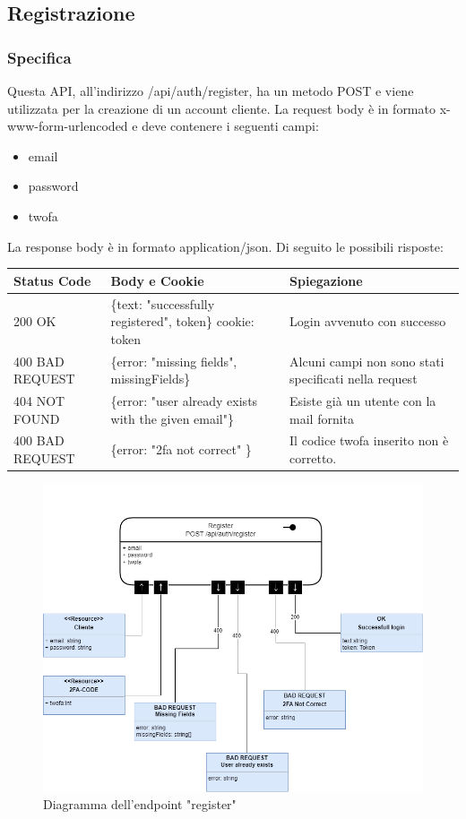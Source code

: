 \documentclass{report}
\begin{document}
\subsection{Registrazione}
\subsubsection*{Specifica}
Questa API, all'indirizzo /api/auth/register, ha un metodo POST e viene utilizzata per la creazione di un account cliente.
La request body è in formato x-www-form-urlencoded e deve contenere i seguenti campi:
\begin{itemize}
	\item email
	\item password
	\item twofa
\end{itemize}
La response body è in formato application/json. Di seguito le possibili risposte:
\begin{center} %
	\centering
	\begin{tabular}{ |p{4cm}|p{5cm}|p{4cm}| }
		\hline
		\centering Status Code & \qquad\quad Body e Cookie & \qquad\qquad Spiegazione\\ %
		\hline
		200 OK & \{text: "successfully registered", token\} cookie: token & Login avvenuto con successo 	\\
		\hline
		400 BAD REQUEST & \{error: "missing fields", missingFields\} & Alcuni campi non sono stati specificati nella request\\ %
		\hline
		404 NOT FOUND & \{error: "user already exists with the given email"\} & Esiste già un utente con la mail fornita\\%
		\hline
		400 BAD REQUEST & \{error: "2fa not correct" \} & Il codice twofa inserito non è corretto. \\
		\hline
	\end{tabular}
\end{center}
\begin{figure}[H]
	\centering\includegraphics[width=1\textwidth]{images/microservizio-autenticazione/diagrams/diagramma_register.drawio.png}
	\caption{Diagramma dell'endpoint "register"}
\end{figure}
\end{document}
